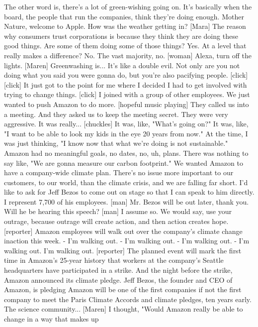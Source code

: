 \documentclass[a4paper]{article}
\begin{document}
	The other word is, there's a lot of green-wishing going on.
	It's basically when the board,
	the people that run the companies, think they're doing enough.
	Mother Nature,
	welcome to Apple.
	How was the weather getting in?
	[Mara] The reason why consumers trust corporations
	is because they think they are doing these good things.
	Are some of them doing some of those things? Yes.
	At a level that really makes a difference? No.
	The vast majority, no.
	[woman] Alexa, turn off the lights.
	[Maren] Greenwashing is... It's like a double evil.
	Not only are you not doing what you said you were gonna do,
	but you're also
	pacifying people.
	[click]
	[click]
	It just got to the point for me where I decided I had to get involved with
	trying to change things.
	[click]
	I joined with a group of other employees.
	We just wanted to push Amazon to do more.
	[hopeful music playing]
	They called us into a meeting.
	And they asked us to keep the meeting secret.
	They were very aggressive. It was really...
	[chuckles] It was, like, "What's going on?"
	It was, like, "I want to be able to look my kids in the eye 20 years from now."
	At the time, I was just thinking,
	"I know now that what we're doing is not sustainable."
	Amazon had no meaningful goals,
	no dates, no, uh, plans.
	There was nothing to say like,
	"We are gonna measure our carbon footprint."
	We wanted Amazon to have a company-wide climate plan.
	There's no issue more important to our customers,
	to our world, than the climate crisis,
	and we are falling far short.
	I'd like to ask for Jeff Bezos to come out on stage
	so that I can speak to him directly.
	I represent 7,700 of his employees.
	[man] Mr. Bezos will be out later, thank you.
	Will he be hearing this speech?
	[man] I assume so.
	We would say, use your outrage,
	because outrage will create action,
	and then action creates hope.
	[reporter] Amazon employees will walk out over
	the company's climate change inaction this week.
	- I'm walking out. - I'm walking out.
	- I'm walking out. - I'm walking out.
	I'm walking out.
	[reporter] The planned event will mark
	the first time in Amazon's 25-year history
	that workers at the company's Seattle headquarters
	have participated in a strike.
	And the night before the strike, Amazon announced its climate pledge.
	Jeff Bezos, the founder and CEO of Amazon, is pledging Amazon
	will be one of the first companies if not the first company
	to meet the Paris Climate Accords and climate pledges, ten years early.
	The science community...
	[Maren] I thought, "Would Amazon really be able to change in a way that makes up
\end{document}
